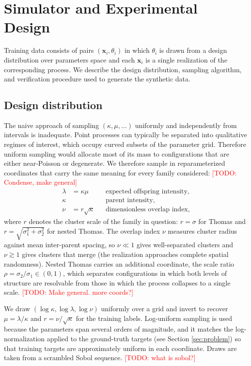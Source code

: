 \documentclass[11pt,letterpaper]{article}
\newcommand{\1}{\mathds{1}}
\newcommand{\pc}{\mathbf{x}}
\newcommand{\todo}[1]{\textcolor{red}{[TODO: #1]}}
\newcommand{\fix}[1]{\textcolor{blue}{[FIX: #1]}}
\newcommand{\todo}[1]{}\newcommand{\fix}[1]{}
\theoremstyle{plain}
\theoremstyle{definitioncolon}
\begin{document}
\section{Simulator and Experimental Design}
\label{sec:simulator}

Training data consists of pairs $(\pc_i, \theta_i)$ in which $\theta_i$ is drawn
from a design distribution over parameters space and each $\pc_i$ is a
single realization of the corresponding process. We describe the design
distribution, sampling algorithm, and verification procedure used to generate
the synthetic data.
\subsection{Design distribution}
\label{ssec:design}

The naive approach of sampling $(\kappa, \mu, \dots)$ uniformly and
independently from intervals is inadequate. Point processes can
typically be separated into qualitative regimes of interest, which occupy curved
subsets of the parameter grid. Therefore uniform sampling would allocate most of
its mass to configurations that are either near-Poisson or degenerate.
We therefore sample in reparameterized coordinates that carry the same meaning
for every family considered: \todo{Condense, make general}
    \begin{align*}
        \lambda &= \kappa\mu && \text{expected offspring intensity,} \\
        \kappa & && \text{parent intensity,} \\
        \nu &= r\sqrt{\kappa} && \text{dimensionless overlap index,}
    \end{align*}
where $r$ denotes the cluster scale of the family in question: $r = \sigma$ for
Thomas and $r = \sqrt{\sigma_1^2 + \sigma_2^2}$
for nested Thomas. The overlap index $\nu$ measures cluster radius against mean
inter-parent spacing, so $\nu \ll 1$ gives well-separated clusters and
$\nu \gtrsim 1$ gives clusters that merge (the realization approaches complete
spatial randomness). Nested Thomas carries an additional coordinate, the scale
ratio $\rho = \sigma_2/\sigma_1 \in (0,1)$, which separates configurations in
which both levels of structure are resolvable from those in which the process
collapses to a single scale. \todo{Make general. more coords?}

We draw $(\log\kappa, \log\lambda, \log\nu)$ uniformly over a grid and invert to
recover $\mu = \lambda/\kappa$ and $r = \nu/\sqrt{\kappa}$ for the training labels. 
Log-uniform sampling
is used because the parameters span several orders of magnitude, and it matches
the log-normalization applied to the ground-truth targets (see
Section \ref{sec:problem}) so that training targets are approximately uniform in
each coordinate. Draws are taken from a scrambled Sobol sequence. \todo{what is sobol?}
\end{document}
